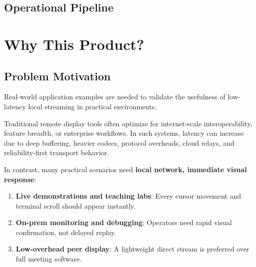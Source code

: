 \documentclass[12pt,a4paper]{article}
\begin{document}
\subsection{Operational Pipeline}
\begin{center}
\end{center}

\newpage

\section{Why This Product?}

\subsection{Problem Motivation}
Real-world application examples are needed to validate the usefulness of low-latency local streaming in practical environments.

Traditional remote display tools often optimize for internet-scale interoperability, feature breadth, or enterprise workflows. In such systems, latency can increase due to deep buffering, heavier codecs, protocol overheads, cloud relays, and reliability-first transport behavior.

In contrast, many practical scenarios need \textbf{local network, immediate visual response}:
\begin{enumerate}[label=\textbf{\arabic*.}, itemsep=6pt]
  \item \textbf{Live demonstrations and teaching labs}: Every cursor movement and terminal scroll should appear instantly.
  \item \textbf{On-prem monitoring and debugging}: Operators need rapid visual confirmation, not delayed replay.
  \item \textbf{Low-overhead peer display}: A lightweight direct stream is preferred over full meeting software.
\end{enumerate}
\end{document}

